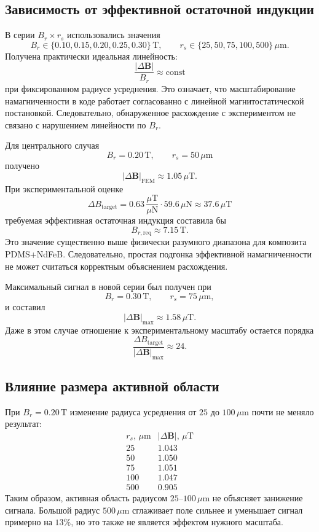 \documentclass[12pt,a4paper]{article}
\begin{document}
\subsection*{Зависимость от эффективной остаточной индукции}

В серии \(B_r\times r_s\) использовались значения
\[
    B_r\in\{0.10,0.15,0.20,0.25,0.30\}\,\mathrm{T},
    \qquad
    r_s\in\{25,50,75,100,500\}\,\mu\mathrm{m}.
\]
Получена практически идеальная линейность:
\[
    \frac{|\Delta\mathbf B|}{B_r}\approx \mathrm{const}
\]
при фиксированном радиусе усреднения. Это означает, что масштабирование
намагниченности в коде работает согласованно с линейной магнитостатической
постановкой. Следовательно, обнаруженное расхождение с экспериментом не
связано с нарушением линейности по \(B_r\).

Для центрального случая
\[
    B_r=0.20\,\mathrm{T},\qquad r_s=50\,\mu\mathrm{m}
\]
получено
\[
    |\Delta\mathbf B|_{\mathrm{FEM}}
    \approx 1.05\,\mu\mathrm{T}.
\]
При экспериментальной оценке
\[
    \Delta B_{\mathrm{target}}
    =
    0.63\,\frac{\mu\mathrm{T}}{\mu\mathrm{N}}
    \cdot 59.6\,\mu\mathrm{N}
    \approx 37.6\,\mu\mathrm{T}
\]
требуемая эффективная остаточная индукция составила бы
\[
    B_{r,\mathrm{req}}
    \approx
    7.15\,\mathrm{T}.
\]
Это значение существенно выше физически разумного диапазона для композита
PDMS+NdFeB. Следовательно, простая подгонка эффективной намагниченности не
может считаться корректным объяснением расхождения.

Максимальный сигнал в новой серии был получен при
\[
    B_r=0.30\,\mathrm{T},\qquad r_s=75\,\mu\mathrm{m},
\]
и составил
\[
    |\Delta\mathbf B|_{\max}\approx 1.58\,\mu\mathrm{T}.
\]
Даже в этом случае отношение к экспериментальному масштабу остается порядка
\[
    \frac{\Delta B_{\mathrm{target}}}{|\Delta\mathbf B|_{\max}}
    \approx 24.
\]

\subsection*{Влияние размера активной области}

При \(B_r=0.20\,\mathrm{T}\) изменение радиуса усреднения от
\(25\) до \(100\,\mu\mathrm{m}\) почти не меняло результат:
\[
\begin{array}{c|c}
 r_s,\,\mu\mathrm{m} & |\Delta\mathbf B|,\,\mu\mathrm{T} \\
 \hline
 25 & 1.043 \\
 50 & 1.050 \\
 75 & 1.051 \\
 100 & 1.047 \\
 500 & 0.905
\end{array}
\]
Таким образом, активная область радиусом \(25\text{--}100\,\mu\mathrm{m}\)
не объясняет занижение сигнала. Большой радиус \(500\,\mu\mathrm{m}\)
сглаживает поле сильнее и уменьшает сигнал примерно на \(13\%\), но это
также не является эффектом нужного масштаба.
\end{document}
